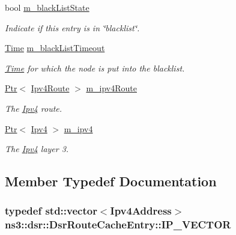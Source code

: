 \begin{DoxyCompactItemize}
bool \hyperlink{classns3_1_1dsr_1_1DsrRouteCacheEntry_ac307e5506678f531af1f39627bba230f}{m\+\_\+black\+List\+State}
\begin{DoxyCompactList}\small\item\em Indicate if this entry is in \char`\"{}blacklist\char`\"{}. \end{DoxyCompactList}\item 
\hyperlink{classns3_1_1Time}{Time} \hyperlink{classns3_1_1dsr_1_1DsrRouteCacheEntry_aa4c08aa3d3815005c7c36a24f7e7d9f5}{m\+\_\+black\+List\+Timeout}
\begin{DoxyCompactList}\small\item\em \hyperlink{classns3_1_1Time}{Time} for which the node is put into the blacklist. \end{DoxyCompactList}\item 
\hyperlink{classns3_1_1Ptr}{Ptr}$<$ \hyperlink{classns3_1_1Ipv4Route}{Ipv4\+Route} $>$ \hyperlink{classns3_1_1dsr_1_1DsrRouteCacheEntry_a7697648c057a5b91c304c76998c89373}{m\+\_\+ipv4\+Route}
\begin{DoxyCompactList}\small\item\em The \hyperlink{classns3_1_1Ipv4}{Ipv4} route. \end{DoxyCompactList}\item 
\hyperlink{classns3_1_1Ptr}{Ptr}$<$ \hyperlink{classns3_1_1Ipv4}{Ipv4} $>$ \hyperlink{classns3_1_1dsr_1_1DsrRouteCacheEntry_a82fe317debad049498ac6e94cf3091a6}{m\+\_\+ipv4}
\begin{DoxyCompactList}\small\item\em The \hyperlink{classns3_1_1Ipv4}{Ipv4} layer 3. \end{DoxyCompactList}\end{DoxyCompactItemize}


\subsection{Member Typedef Documentation}
\subsubsection[{\texorpdfstring{I\+P\+\_\+\+V\+E\+C\+T\+OR}{IP_VECTOR}}]{\setlength{\rightskip}{0pt plus 5cm}typedef std\+::vector$<${\bf Ipv4\+Address}$>$ {\bf ns3\+::dsr\+::\+Dsr\+Route\+Cache\+Entry\+::\+I\+P\+\_\+\+V\+E\+C\+T\+OR}}\hypertarget{classns3_1_1dsr_1_1DsrRouteCacheEntry_ab834177006bdbfd2e3fa607c2a88cbdf}{}\label{classns3_1_1dsr_1_1DsrRouteCacheEntry_ab834177006bdbfd2e3fa607c2a88cbdf}


